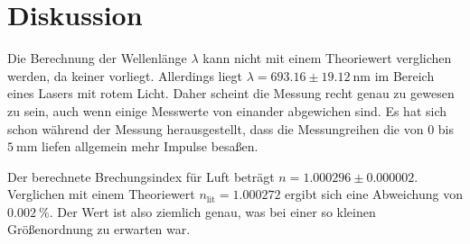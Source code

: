 \section{Diskussion}
\label{sec:Diskussion}


Die Berechnung der Wellenlänge $\lambda$ kann nicht mit einem Theoriewert verglichen werden, da keiner vorliegt. Allerdings liegt $\lambda = 693.16 \pm \SI{19.12}{\nano\meter}$ im Bereich eines Lasers mit rotem Licht. 
Daher scheint die Messung recht genau zu gewesen zu sein, auch wenn einige Messwerte von einander abgewichen sind.
Es hat sich schon während der Messung herausgestellt, dass die Messungreihen die von $0$ bis $\SI{5}{\milli\meter}$ liefen allgemein mehr Impulse besaßen.

Der berechnete Brechungsindex für Luft beträgt $n = 1.000296 \pm 0.000002$.
Verglichen mit einem Theoriewert $n_\text{lit} = 1.000272$ ergibt sich eine Abweichung von $\SI{0.002}{\percent}$. \cite{brechung}
Der Wert ist also ziemlich genau, was bei einer so kleinen Größenordnung zu erwarten war. 
